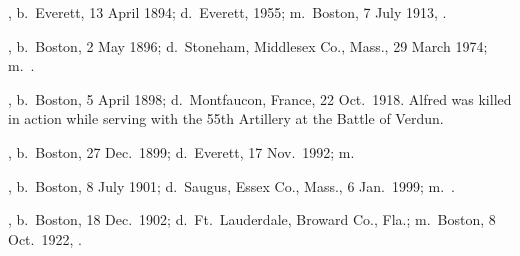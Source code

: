\begin{Kids}
	, b.\ Everett, 13 April 1894;\cite{Robert5McGurinBirth} d.\ Everett, 1955;\cite{Robert5McGurinDeath} m.\ Boston, 7 July 1913, .\cite{Robert5McGurinMarriage}
	
	, b.\ Boston, 2 May 1896;\cite{Walter5McGurinBirth} d.\ Stoneham, Middlesex Co., Mass., 29 March 1974;\cite{Walter5McGurinDeath:1} m.\ .\cite{Walter5McGurinDeath:2}
	
	, b.\ Boston, 5 April 1898;\cite{Alfred5McGurinBirth} d.\ Montfaucon, France, 22 Oct.\ 1918.\cite{Alfred5McGurinDeath} Alfred was killed in action while serving with the 55th Artillery at the Battle of Verdun.\cite{Alfred5McGurinDeath2}
	
	, b.\ Boston, 27 Dec.\ 1899;\cite{Margaret5McGurinBirth} d.\ Everett, 17 Nov.\ 1992;\cite{Margaret5McGurinDeath:1} m.\ \cite{Margaret5McGurinDeath:2}
	
	, b.\ Boston, 8 July 1901;\cite{Sarah5McGurinBirth} d.\ Saugus, Essex Co., Mass., 6 Jan.\ 1999;\cite{Sarah5McGurinDeath:1} m.\ .\cite{Sarah5McGurinDeath:2}
	
	, b.\ Boston, 18 Dec.\ 1902;\cite{Edward5McGurinBirth} d.\ Ft.\ Lauderdale, Broward Co., Fla.;\cite{Edward5McGurinDeath} m.\ Boston, 8 Oct.\ 1922, .\cite{Edward5McGurinMarriage}
	

\end{Kids}
